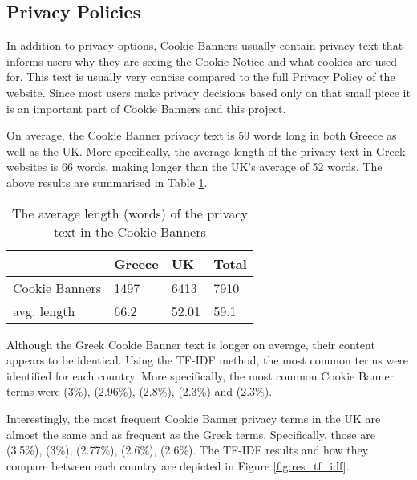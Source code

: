 \documentclass[../main.tex]{subfiles}
\begin{document}
\subsection{Privacy Policies}
In addition to privacy options, Cookie Banners usually contain privacy text that informs users why they are seeing the Cookie Notice and what cookies are used for. This text is usually very concise compared to the full Privacy Policy of the website. Since most users make privacy decisions based only on that small piece it is an important part of Cookie Banners and this project.

On average, the Cookie Banner privacy text is 59 words long in both Greece as well as the UK. More specifically, the average length of the privacy text in Greek websites is 66 words, making longer than the UK’s average of 52 words. The above results are summarised in Table \ref{tab:privacy_txt_len}.

\begin{table}[ht]
    \centering
    \begin{tabular}{@{}llll@{}}
        \toprule
                       & Greece & UK    & Total \\ \midrule
        Cookie Banners & 1497   & 6413  & 7910  \\
        avg. length    & 66.2   & 52.01 & 59.1  \\ \bottomrule
    \end{tabular}
    \caption{The average length (words) of the privacy text in the Cookie Banners}
    \label{tab:privacy_txt_len}
\end{table}

Although the Greek Cookie Banner text is longer on average, their content appears to be identical. Using the TF-IDF method, the most common terms were identified for each country. More specifically, the most common Cookie Banner terms were  (3\%),  (2.96\%),  (2.8\%),  (2.3\%) and  (2.3\%). 

Interestingly, the most frequent Cookie Banner privacy terms in the UK are almost the same and as frequent as the Greek terms. Specifically, those are  (3.5\%),  (3\%),  (2.77\%),  (2.6\%),  (2.6\%). The TF-IDF results and how they compare between each country are depicted in Figure \ref{fig:res_tf_idf}.

\grTFIDF
\end{document}
